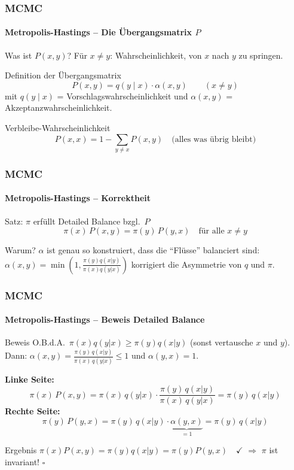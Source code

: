 \documentclass{beamer}
\begin{document}

\begin{frame}
    \frametitle{MCMC}
\framesubtitle{Metropolis-Hastings -- Die Übergangsmatrix $P$}
    \begin{block}{Was ist $P(x,y)$?}
Für $x \neq y$: Wahrscheinlichkeit, von $x$ nach $y$ zu springen.
\end{block}
\begin{block}{Definition der Übergangsmatrix}
\[
P(x,y) = q(y \mid x) \cdot \alpha(x,y) \qquad (x \neq y)
\]
mit $q(y \mid x)$ = Vorschlagswahrscheinlichkeit und $\alpha(x,y)$ = Akzeptanzwahrscheinlichkeit.
\end{block}
\begin{block}{Verbleibe-Wahrscheinlichkeit}
\[
P(x,x) = 1 - \sum_{y \neq x} P(x,y) \quad \text{(alles was übrig bleibt)}
\]
\end{block}
 \end{frame}



\begin{frame}
    \frametitle{MCMC}
\framesubtitle{Metropolis-Hastings -- Korrektheit}
    \begin{block}{Satz: $\pi$ erfüllt Detailed Balance bzgl.\ $P$}
\[
\pi(x)\, P(x,y) = \pi(y)\, P(y,x) \quad \text{für alle } x \neq y
\]
\end{block}
\begin{block}{Warum?}
$\alpha$ ist genau so konstruiert, dass die ``Flüsse'' balanciert sind:\\[0.1cm]
$\alpha(x,y) = \min\!\left(1, \frac{\pi(y)q(x|y)}{\pi(x)q(y|x)}\right)$ korrigiert die Asymmetrie von $q$ und $\pi$.
\end{block}
 \end{frame}



\begin{frame}
    \frametitle{MCMC}
\framesubtitle{Metropolis-Hastings -- Beweis Detailed Balance}
    \begin{block}{Beweis}
O.B.d.A.\ $\pi(x)q(y|x) \geq \pi(y)q(x|y)$\; (sonst vertausche $x$ und $y$). Dann:
$\alpha(x,y) = \frac{\pi(y)\,q(x|y)}{\pi(x)\,q(y|x)} \leq 1$ \; und \; $\alpha(y,x) = 1$.
\end{block}
\textbf{Linke Seite:}
\[
\pi(x)\, P(x,y) = \pi(x)\, q(y|x) \cdot \frac{\pi(y)\,q(x|y)}{\pi(x)\,q(y|x)} = \pi(y)\,q(x|y)
\]
\textbf{Rechte Seite:}
\[
\pi(y)\, P(y,x) = \pi(y)\, q(x|y) \cdot \underbrace{\alpha(y,x)}_{= 1} = \pi(y)\,q(x|y)
\]
\begin{block}{Ergebnis}
$\pi(x) P(x,y) = \pi(y) q(x|y) = \pi(y) P(y,x) \quad \checkmark$ \quad $\Rightarrow$ $\pi$ ist invariant! \hfill $\square$
\end{block}
 \end{frame}
\end{document}
